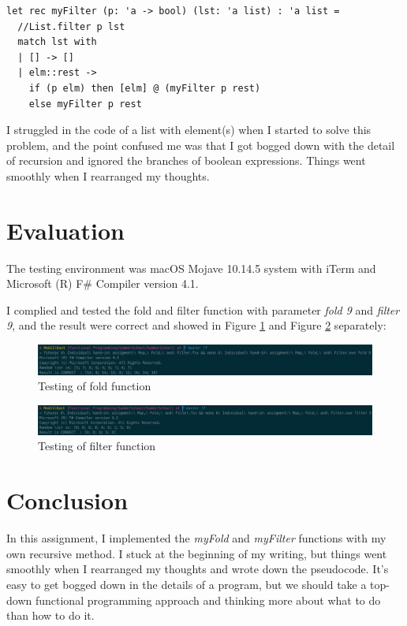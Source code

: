 \documentclass{article}
\begin{document}
\begin{lstlisting}
let rec myFilter (p: 'a -> bool) (lst: 'a list) : 'a list =
  //List.filter p lst
  match lst with
  | [] -> []
  | elm::rest -> 
    if (p elm) then [elm] @ (myFilter p rest)
    else myFilter p rest
\end{lstlisting}

I struggled in the code of a list with element(s) when I started to solve this problem, and the point confused me was that I got bogged down with the detail of recursion and ignored the branches of boolean expressions. Things went smoothly when I rearranged my thoughts.

\section{Evaluation}

The testing environment was macOS Mojave 10.14.5 system with iTerm and Microsoft (R) F\# Compiler version 4.1.

I complied and tested the fold and filter function with parameter \emph{fold 9} and \emph{filter 9}, and the result were correct and showed in Figure \ref{fig:fold} and Figure \ref{fig:filter} separately:

\begin{figure}[h]
      \centering
      \includegraphics[width=\linewidth]{fold2}
      \caption{Testing of fold function}
      \label{fig:fold}
\end{figure}

\begin{figure}[h]
      \centering
      \includegraphics[width=\linewidth]{filter2}
      \caption{Testing of filter function}
      \label{fig:filter}
\end{figure}

\section{Conclusion}

In this assignment, I implemented the \emph{myFold} and \emph{myFilter} functions with my own recursive method. I stuck at the beginning of my writing, but things went smoothly when I rearranged my thoughts and wrote down the pseudocode. It's easy to get bogged down in the details of a program, but we should take a top-down functional programming approach and thinking more about what to do than how to do it.
\end{document}
